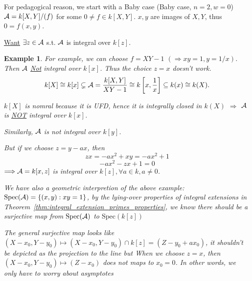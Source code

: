 \documentclass[11pt]{article}
\newtheorem{ex}[thm]{Example}
\newcommand{\cala}{{\cal A}}
\newcommand{\Lrta}{\Longrightarrow}
\begin{document}
For pedagogical reason, we start with a Baby case
(Baby case, $n=2,w=0$) $\cala=k[X,Y]/(f)$ for some $0\neq f\in k[X,Y]$. $x,y$ are images of $X,Y$, thus $0=f(x,y)$. 

\underline{Want} $\exists z\in \cala$ s.t. $\cala$ is integral over $k[z]$.

\begin{ex}
For example, we can choose $f=XY-1$ $(\Lrta xy=1,y=1/x)$. Then $\cala$ \underline{Not} integral over $k[x]$. Thus the choice $z=x$ doesn't work.
$$
k[X]\cong k[x]\subsetneq \cala=\frac{k[X,Y]}{XY-1}\cong k\left[x,\frac{1}{x}\right]\subseteq k(x)\cong k(X).
$$

$k[X]$ is nomral because it is UFD, hence it is integrally closed in $k(X)$ $\Lrta$ $\cala$ is \underline{NOT} integral over $k[x]$.

Similarly, $\cala$ is not integral over $k[y]$.

But if we choose $z=y-ax$, then
$$
zx=-ax^2+xy=-ax^2+1
$$
$$
-ax^2-zx+1=0
$$
$\Lrta \cala=k[x,z]$ is integral over $k[z], \forall a\in k, a\neq 0$.

We have also a geometric interpretion of the above example:
$\text{Spec}(\cala)=\{(x,y): xy=1\}$, by the lying-over properties of integral extensions in Theorem~\ref{thm:integral_extension_primes_properties}, we know there should be a surjective map from $\text{Spec}(\cala)$ to $\text{Spec}(k[z])$
{\centering
{}
}


{\color{red} The general surjective map looks like $(X-x_0,Y-y_0)\longmapsto (X-x_0,Y-y_0)\cap k[z]=(Z-y_0+a x_0) $, it shouldn't be depicted as the projection to the line but When we choose $z=x$, then $(X-x_0,Y-y_0)\longmapsto (Z-x_0)$ does not maps to $x_0=0$. In other words, we only have to worry about asymptotes}
\end{ex}
\end{document}
